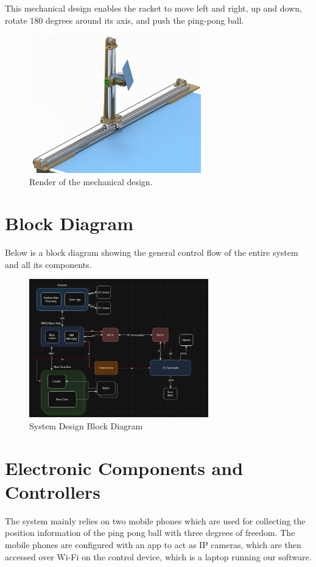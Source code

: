 This mechanical design enables the racket to move left and right, up and down, rotate 180 degrees around its axis, and push the ping-pong ball.

\begin{figure}[h] 
	\centering \includegraphics[height=6cm]{./images/render.jpg}
	\caption{Render of the mechanical design.}
\end{figure}

\section{Block Diagram}
Below is a block diagram showing the general control flow of the entire system and all its components.

\begin{figure}[h]
	\centering\includegraphics[height=6cm]{./images/blockdiagram}
	\caption{System Design Block Diagram}
\end{figure}

\section{Electronic Components and Controllers}
The system mainly relies on two mobile phones which are used for collecting the position information of the ping pong ball with three degrees of freedom. The mobile phones are configured with an app to act as IP cameras, which are then accessed over Wi-Fi on the control device, which is a laptop running our software.

